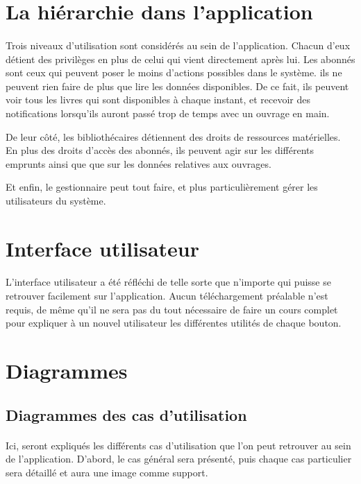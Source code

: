 \section{La hiérarchie dans l'application}
\paragraph{}
Trois niveaux d'utilisation sont considérés au sein de l'application.
Chacun d'eux détient des privilèges en plus de celui qui vient directement après lui.
Les abonnés sont ceux qui peuvent poser le moins d'actions possibles dans le système. ils 
ne peuvent rien faire de plus que lire les données disponibles. De ce fait, 
ils peuvent voir tous les livres qui sont disponibles à chaque instant, et recevoir 
des notifications lorsqu'ils auront passé trop de temps avec un ouvrage en main.\par 
De leur côté, les bibliothécaires détiennent des droits de ressources matérielles. En plus
des droits d'accès des abonnés, ils peuvent agir sur les différents 
emprunts ainsi que que sur les données relatives aux ouvrages. \par 
Et enfin, le gestionnaire peut tout faire, et plus particulièrement gérer les 
utilisateurs du système.
\section{Interface utilisateur}
\paragraph{}       
L'interface utilisateur a été réfléchi de telle sorte que n'importe qui 
puisse se retrouver facilement sur l'application. Aucun téléchargement préalable n'est requis, de même 
qu'il ne sera pas du tout nécessaire de faire un cours complet pour expliquer à un nouvel utilisateur
les différentes utilités de chaque bouton.

\section{Diagrammes}
\subsection{Diagrammes des cas d'utilisation}
\paragraph{}
Ici, seront expliqués les différents cas d'utilisation que l'on peut retrouver au sein de 
l'application. D'abord, le cas général sera présenté, puis chaque cas particulier sera détaillé
et aura une image comme support.
